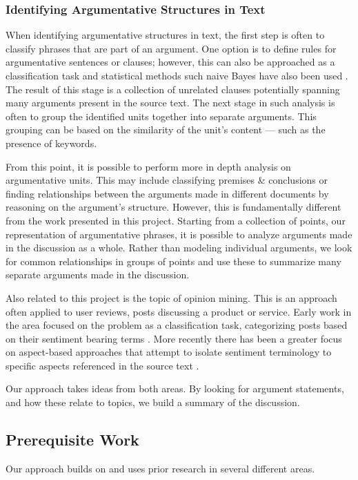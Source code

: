       \tocless\subsubsection{Identifying Argumentative Structures in Text}

        When identifying argumentative structures in text, the first step is often to classify phrases that are part of an argument. One option is to define rules for argumentative sentences or clauses; however, this can also be approached as a classification task and statistical methods such naive Bayes have also been used \cite{palau2009argumentation}. The result of this stage is a collection of unrelated clauses potentially spanning many arguments present in the source text. The next stage in such analysis is often to group the identified units together into separate arguments. This grouping can be based on the similarity of the unit's content --- such as the presence of keywords.

        From this point, it is possible to perform more in depth analysis on argumentative units. This may include classifying premises \& conclusions or finding relationships between the arguments made in different documents by reasoning on the argument's structure. However, this is fundamentally different from the work presented in this project. Starting from a collection of points, our representation of argumentative phrases, it is possible to analyze arguments made in the discussion as a whole. Rather than modeling individual arguments, we look for common relationships in groups of points and use these to summarize many separate arguments made in the discussion.

    Also related to this project is the topic of opinion mining. This is an approach often applied to user reviews, posts discussing a product or service. Early work in the area focused on the problem as a classification task, categorizing posts based on their sentiment bearing terms \cite{turney2002thumbs}. More recently there has been a greater focus on aspect-based approaches that attempt to isolate sentiment terminology to specific aspects referenced in the source text \cite{hu2004mining}.

    Our approach takes ideas from both areas. By looking for argument statements, and how these relate to topics, we build a summary of the discussion.

    \tocless\subsection{Prerequisite Work}
      Our approach builds on and uses prior research in several different areas.

